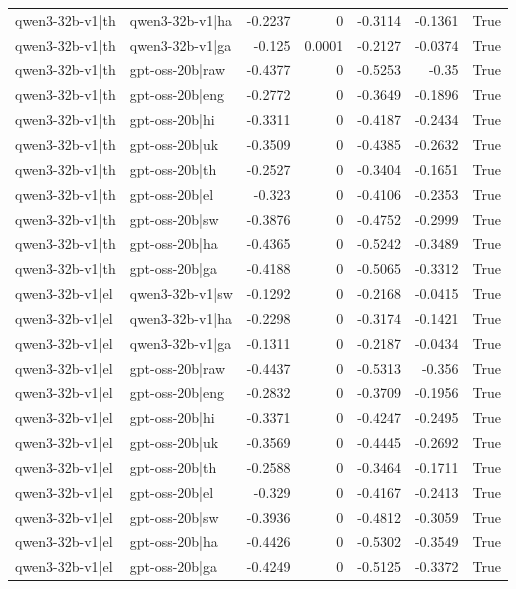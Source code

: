 \begin{table}
\begin{tabular}{l l r r r r l}
qwen3-32b-v1|th & qwen3-32b-v1|ha & -0.2237 & 0 & -0.3114 & -0.1361 & True \\
qwen3-32b-v1|th & qwen3-32b-v1|ga & -0.125 & 0.0001 & -0.2127 & -0.0374 & True \\
qwen3-32b-v1|th & gpt-oss-20b|raw & -0.4377 & 0 & -0.5253 & -0.35 & True \\
qwen3-32b-v1|th & gpt-oss-20b|eng & -0.2772 & 0 & -0.3649 & -0.1896 & True \\
qwen3-32b-v1|th & gpt-oss-20b|hi & -0.3311 & 0 & -0.4187 & -0.2434 & True \\
qwen3-32b-v1|th & gpt-oss-20b|uk & -0.3509 & 0 & -0.4385 & -0.2632 & True \\
qwen3-32b-v1|th & gpt-oss-20b|th & -0.2527 & 0 & -0.3404 & -0.1651 & True \\
qwen3-32b-v1|th & gpt-oss-20b|el & -0.323 & 0 & -0.4106 & -0.2353 & True \\
qwen3-32b-v1|th & gpt-oss-20b|sw & -0.3876 & 0 & -0.4752 & -0.2999 & True \\
qwen3-32b-v1|th & gpt-oss-20b|ha & -0.4365 & 0 & -0.5242 & -0.3489 & True \\
qwen3-32b-v1|th & gpt-oss-20b|ga & -0.4188 & 0 & -0.5065 & -0.3312 & True \\
qwen3-32b-v1|el & qwen3-32b-v1|sw & -0.1292 & 0 & -0.2168 & -0.0415 & True \\
qwen3-32b-v1|el & qwen3-32b-v1|ha & -0.2298 & 0 & -0.3174 & -0.1421 & True \\
qwen3-32b-v1|el & qwen3-32b-v1|ga & -0.1311 & 0 & -0.2187 & -0.0434 & True \\
qwen3-32b-v1|el & gpt-oss-20b|raw & -0.4437 & 0 & -0.5313 & -0.356 & True \\
qwen3-32b-v1|el & gpt-oss-20b|eng & -0.2832 & 0 & -0.3709 & -0.1956 & True \\
qwen3-32b-v1|el & gpt-oss-20b|hi & -0.3371 & 0 & -0.4247 & -0.2495 & True \\
qwen3-32b-v1|el & gpt-oss-20b|uk & -0.3569 & 0 & -0.4445 & -0.2692 & True \\
qwen3-32b-v1|el & gpt-oss-20b|th & -0.2588 & 0 & -0.3464 & -0.1711 & True \\
qwen3-32b-v1|el & gpt-oss-20b|el & -0.329 & 0 & -0.4167 & -0.2413 & True \\
qwen3-32b-v1|el & gpt-oss-20b|sw & -0.3936 & 0 & -0.4812 & -0.3059 & True \\
qwen3-32b-v1|el & gpt-oss-20b|ha & -0.4426 & 0 & -0.5302 & -0.3549 & True \\
qwen3-32b-v1|el & gpt-oss-20b|ga & -0.4249 & 0 & -0.5125 & -0.3372 & True \\

\end{tabular}
\end{table}
